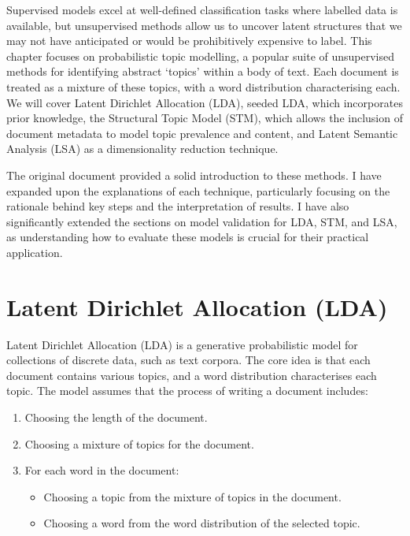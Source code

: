 \documentclass[
]{book}
\providecommand{\tightlist}{%
  \setlength{\itemsep}{0pt}\setlength{\parskip}{0pt}}
\begin{document}
Supervised models excel at well-defined classification tasks where labelled data is available, but unsupervised methods allow us to uncover latent structures that we may not have anticipated or would be prohibitively expensive to label.
This chapter focuses on probabilistic topic modelling, a popular suite of unsupervised methods for identifying abstract `topics' within a body of text.
Each document is treated as a mixture of these topics, with a word distribution characterising each.
We will cover Latent Dirichlet Allocation (LDA), seeded LDA, which incorporates prior knowledge, the Structural Topic Model (STM), which allows the inclusion of document metadata to model topic prevalence and content, and Latent Semantic Analysis (LSA) as a dimensionality reduction technique.

The original document provided a solid introduction to these methods.
I have expanded upon the explanations of each technique, particularly focusing on the rationale behind key steps and the interpretation of results.
I have also significantly extended the sections on model validation for LDA, STM, and LSA, as understanding how to evaluate these models is crucial for their practical application.

\section{Latent Dirichlet Allocation (LDA)}\label{latent-dirichlet-allocation-lda}

Latent Dirichlet Allocation (LDA) is a generative probabilistic model for collections of discrete data, such as text corpora.
The core idea is that each document contains various topics, and a word distribution characterises each topic.
The model assumes that the process of writing a document includes:

\begin{enumerate}
\def\labelenumi{\arabic{enumi}.}
\tightlist
\item
  Choosing the length of the document.
\item
  Choosing a mixture of topics for the document.
\item
  For each word in the document:

  \begin{itemize}
  \tightlist
  \item
    Choosing a topic from the mixture of topics in the document.
  \item
    Choosing a word from the word distribution of the selected topic.
  \end{itemize}
\end{enumerate}
\end{document}
